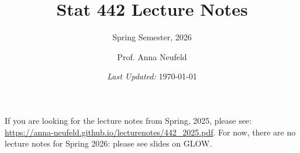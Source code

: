 \documentclass[titlepage,10pt]{scrartcl}
\title{Stat 442 Lecture Notes}
\subtitle{Spring Semester, 2026}
\author{Prof. Anna Neufeld}
\date{\small\emph{Last Updated:} \today}
\begin{document}
\maketitle
\hrulefill

If you are looking for the lecture notes from Spring, 2025, please see: \url{https://anna-neufeld.github.io/lecturenotes/442_2025.pdf}. For now, there are no lecture notes for Spring 2026: please see slides on GLOW. 


%
%
%
\end{document}
